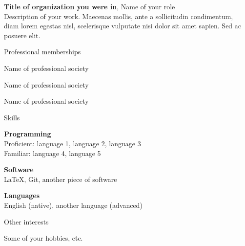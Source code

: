 \documentclass[letterpaper, 10pt]{article}
\newcommand{\heading}[1]{{\Large\color{Mahogany} #1}\medskip}
\begin{document}
\textbf{Title of organization you were in}, Name of your role \\
Description of your work. Maecenas mollis, ante a sollicitudin condimentum, diam lorem egestas nisl, scelerisque vulputate nisi dolor sit amet sapien. Sed ac posuere elit.

\bigskip\bigskip


\heading{Professional memberships}

Name of professional society

Name of professional society

Name of professional society

\bigskip\bigskip


\heading{Skills}

\textbf{Programming} \\
Proficient: language 1, language 2, language 3 \\
Familiar: language 4, language 5 \medskip

\textbf{Software} \\
\LaTeX, Git, another piece of software \medskip

\textbf{Languages} \\
English (native), another language (advanced)

\bigskip\bigskip


\heading{Other interests}

Some of your hobbies, etc.

\end{document}
